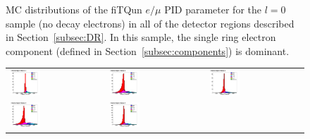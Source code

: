 \begin{figure}[h!]
\begin{tabular}{l  l  l}
\end{tabular}
\caption{MC distributions of the fiTQun $e/\mu$ PID parameter for the $l = 0$
sample (no decay electrons) in all of the detector regions described in
Section~\ref{subsec:DR}.  In this sample, the single ring electron component
(defined in Section~\ref{subsec:components}) is dominant.}
\label{fig:samplot0}
\end{figure}

\begin{figure}[h!]
\centering
\begin{tabular}{l  l  l}
  \includegraphics[width=0.33\textwidth]{plots/mc_breakdown_comp_1_bin_0_att_0} 
  &\includegraphics[width=0.33\textwidth]{plots/mc_breakdown_comp_1_bin_1_att_0}  
  &\includegraphics[width=0.33\textwidth]{plots/mc_breakdown_comp_1_bin_2_att_0} \\
  \includegraphics[width=0.33\textwidth]{plots/mc_breakdown_comp_1_bin_3_att_0} 
  &\includegraphics[width=0.33\textwidth]{plots/mc_breakdown_comp_1_bin_4_att_0} 

\end{tabular}
\end{figure}
